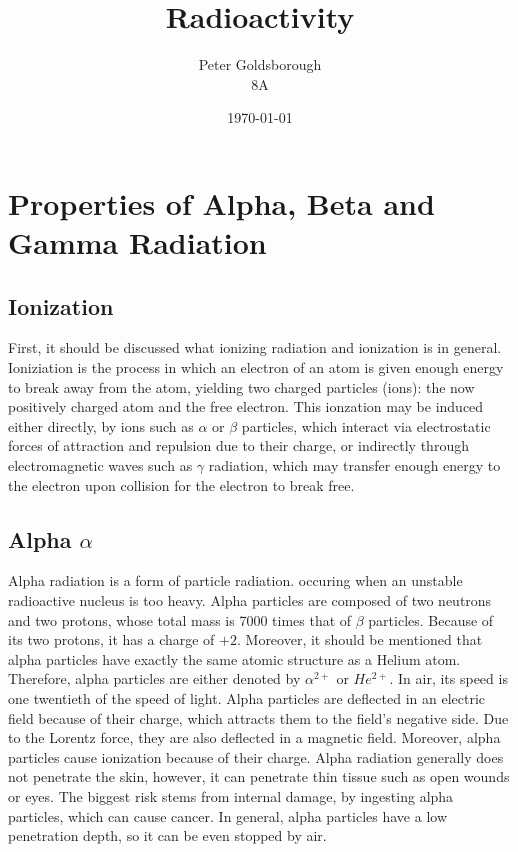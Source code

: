 




\title{\Huge Radioactivity}

\author {
Peter Goldsborough\\
8A
}

\date{\today}

\maketitle

\chapter*{Properties of Alpha, Beta and Gamma Radiation}

\section*{Ionization}

First, it should be discussed what ionizing radiation and ionization is in general. Ioniziation is the process in which an electron of an atom is given enough energy to break away from the atom, yielding two charged particles (ions): the now positively charged atom and the free electron. This ionzation may be induced either directly, by ions such as $\alpha$ or $\beta$ particles, which interact via electrostatic forces of attraction and repulsion due to their charge, or indirectly through electromagnetic waves such as $\gamma$ radiation, which may transfer enough energy to the electron upon collision for the electron to break free.

\section*{Alpha $\alpha$}

Alpha radiation is a form of particle radiation. occuring when an unstable radioactive nucleus is too heavy. Alpha particles are composed of two neutrons and two protons, whose total mass is 7000 times that of $\beta$ particles. Because of its two protons, it has a charge of $+2$. Moreover, it should be mentioned that alpha particles have exactly the same atomic structure as a Helium atom. Therefore, alpha particles are either denoted by $\alpha^{2+}$ or $He^{2+}$. In air, its speed is one twentieth of the speed of light. Alpha particles are deflected in an electric field because of their charge, which attracts them to the field's negative side. Due to the Lorentz force, they are also deflected in a magnetic field. Moreover, alpha particles cause ionization because of their charge. Alpha radiation generally does not penetrate the skin, however, it can penetrate thin tissue such as open wounds or eyes. The biggest risk stems from internal damage, by ingesting alpha particles, which can cause cancer. In general, alpha particles have a low penetration depth, so it can be even stopped by air.

